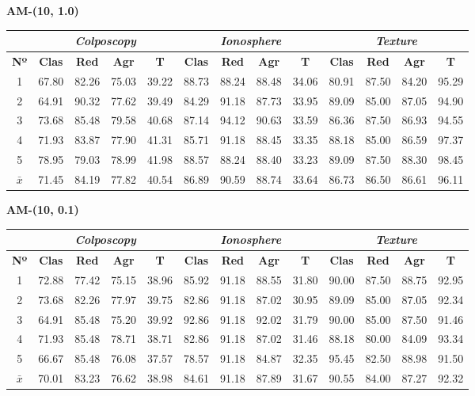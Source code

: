 \documentclass[12pt]{article}
\begin{document}
\textbf{AM-(10, 1.0)}

\begin{table}[ht!]
\begin{tabular}{ccccc|cccc|cccc}
\centering
 & \multicolumn{4}{c}{\textit{Colposcopy}} & \multicolumn{4}{c}{\textit{Ionosphere}} & \multicolumn{4}{c}{\textit{Texture}} \\ \hline
\textbf{Nº} & \textbf{Clas} & \textbf{Red} & \textbf{Agr} & \textbf{T} & \textbf{Clas} & \textbf{Red} & \textbf{Agr} & \textbf{T} & \textbf{Clas} & \textbf{Red} & \textbf{Agr} & \textbf{T} \\ \hline
1 & 67.80 & 82.26 & 75.03 & 39.22 & 88.73 & 88.24 & 88.48 & 34.06 & 80.91 & 87.50 & 84.20 & 95.29 \\
2 & 64.91 & 90.32 & 77.62 & 39.49 & 84.29 & 91.18 & 87.73 & 33.95 & 89.09 & 85.00 & 87.05 & 94.90 \\
3 & 73.68 & 85.48 & 79.58 & 40.68 & 87.14 & 94.12 & 90.63 & 33.59 & 86.36 & 87.50 & 86.93 & 94.55 \\
4 & 71.93 & 83.87 & 77.90 & 41.31 & 85.71 & 91.18 & 88.45 & 33.35 & 88.18 & 85.00 & 86.59 & 97.37 \\
5 & 78.95 & 79.03 & 78.99 & 41.98 & 88.57 & 88.24 & 88.40 & 33.23 & 89.09 & 87.50 & 88.30 & 98.45 \\
\hline
$\bar{x}$ & 71.45 & 84.19 & 77.82 & 40.54 & 86.89 & 90.59 & 88.74 & 33.64 & 86.73 & 86.50 & 86.61 & 96.11 \\
\end{tabular}
\end{table}


\textbf{AM-(10, 0.1)}

\begin{table}[ht!]
\begin{tabular}{ccccc|cccc|cccc}
\centering
 & \multicolumn{4}{c}{\textit{Colposcopy}} & \multicolumn{4}{c}{\textit{Ionosphere}} & \multicolumn{4}{c}{\textit{Texture}} \\ \hline
\textbf{Nº} & \textbf{Clas} & \textbf{Red} & \textbf{Agr} & \textbf{T} & \textbf{Clas} & \textbf{Red} & \textbf{Agr} & \textbf{T} & \textbf{Clas} & \textbf{Red} & \textbf{Agr} & \textbf{T} \\ \hline
1 & 72.88 & 77.42 & 75.15 & 38.96 & 85.92 & 91.18 & 88.55 & 31.80 & 90.00 & 87.50 & 88.75 & 92.95 \\
2 & 73.68 & 82.26 & 77.97 & 39.75 & 82.86 & 91.18 & 87.02 & 30.95 & 89.09 & 85.00 & 87.05 & 92.34 \\
3 & 64.91 & 85.48 & 75.20 & 39.92 & 92.86 & 91.18 & 92.02 & 31.79 & 90.00 & 85.00 & 87.50 & 91.46 \\
4 & 71.93 & 85.48 & 78.71 & 38.71 & 82.86 & 91.18 & 87.02 & 31.46 & 88.18 & 80.00 & 84.09 & 93.34 \\
5 & 66.67 & 85.48 & 76.08 & 37.57 & 78.57 & 91.18 & 84.87 & 32.35 & 95.45 & 82.50 & 88.98 & 91.50 \\
\hline
$\bar{x}$ & 70.01 & 83.23 & 76.62 & 38.98 & 84.61 & 91.18 & 87.89 & 31.67 & 90.55 & 84.00 & 87.27 & 92.32 \\
\end{tabular}
\end{table}
\newpage
\end{document}
